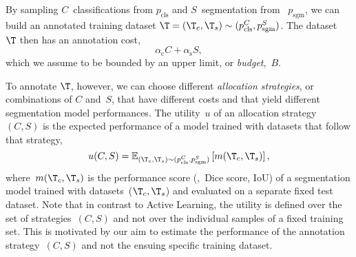 By sampling $C$~classifications from $p_\textrm{cls}$ and $S$~segmentation from ~$p_\textrm{sgm}$, we can build an annotated training dataset $\T=(\T_c,\T_s)\sim{}(p_\textrm{cls}^C, p_\textrm{sgm}^S)$. The dataset~$\T$ then has an annotation cost,
\begin{equation}
    \alpha_\textrm{c}C+\alpha_\textrm{s}S,
\end{equation}
which we assume to be bounded by an upper limit, or \emph{budget},~$B$.

To annotate $\T$, however, we can choose different \emph{allocation strategies}, or combinations of $C$ and~$S$, that have different costs and that yield different segmentation model performances. The utility~$u$ of an allocation strategy~$(C, S)$ is the expected performance of a model trained with datasets that follow that strategy,
\begin{equation}
    \label{eq:utility}
    u(C, S) = \mathbb{E}_{(\T_c,\T_s) \sim{}(p_\textrm{cls}^C, p_\textrm{sgm}^S)} \left[m(\T_c, \T_s)\right],
\end{equation}
\noindent
where~$m(\T_c, \T_s)$ is the performance score (\eg,~Dice score, IoU) of a segmentation model trained with datasets~($\T_c, \T_s$) and evaluated on a separate fixed test dataset. Note that in contrast to Active Learning, the utility is defined over the set of strategies~$(C,S)$ and not over the individual samples of a fixed training set. This is motivated by our aim to estimate the performance of the annotation strategy~$(C, S)$ and not the ensuing specific training dataset. 


